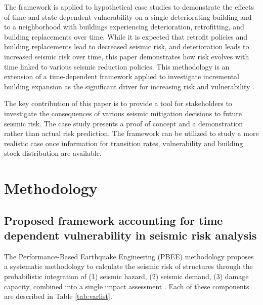 The framework is applied to hypothetical case studies to demonstrate the effects of time and state dependent vulnerability on a single deteriorating building and to a neighborhood with buildings experiencing deterioration, retrofitting, and building replacements over time. While it is expected that retrofit policies and building replacements lead to decreased seismic risk, and deterioration leads to increased seismic risk over time, this paper demonstrates how risk evolves with time linked to various seismic reduction policies. This methodology is an extension of a time-dependent framework applied to investigate incremental building expansion as the significant driver for increasing risk and vulnerability \citep{lallemant2017framework}.

The key contribution of this paper is to provide a tool for stakeholders to investigate the consequences of various seismic mitigation decisions to future seismic risk. The case study presents a proof of concept and a demonstration rather than actual risk prediction. The framework can be utilized to study a more realistic case once information for transition rates, vulnerability and building stock distribution are available.

\section{Methodology}

\subsection{Proposed framework accounting for time dependent vulnerability in seismic risk analysis}

The Performance-Based Earthquake Engineering (PBEE) methodology proposes a systematic methodology to calculate the seismic risk of structures through the probabilistic integration of (1) seismic hazard, (2) seismic demand, (3) damage capacity, combined into a single impact assessment \citep{krawinkler2004performance}.  Each of these components are described in Table \ref{tab:varlist}. 


